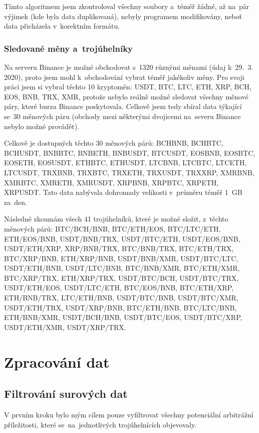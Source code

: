 \documentclass[thesis=B,czech]{FITthesis}[2019/03/21]
\begin{document}
Tímto algoritmem jsem zkontroloval všechny soubory a~téměř žádné, až na~pár výjimek (kde byla data duplikovaná), nebyly programem modifikovány, neboť data přicházela v~korektním formátu.

\subsubsection{Sledované měny a~trojúhelníky}
Na serveru Binance je možné obchodovat s~1320 různými měnami (údaj k~29.~3. 2020), proto jsem mohl k~obchodování vybrat téměř jakékoliv měny. Pro svoji práci jsem si vybral těchto 10 kryptoměn: USDT, BTC, LTC, ETH, XRP, BCH, EOS, BNB, TRX, XMR, protože nebylo reálně možné sledovat všechny měnové páry, které burza Binance poskytovala. Celkově jsem tedy sbíral data týkající se~30 měnových páru (obchody mezi některými dvojicemi na~severu Binance nebylo možné provádět).

Celkově je dostupných těchto 30 měnových párů: BCHBNB, BCHBTC, BCHUSDT, BNBBTC, BNBETH, BNBUSDT, BTCUSDT, EOSBNB,  \linebreak EOSBTC, EOSETH, EOSUSDT, ETHBTC, ETHUSDT, LTCBNB, LTCBTC, LTCETH, LTCUSDT, TRXBNB, TRXBTC, TRXETH, TRXUSDT,  \linebreak TRXXRP, XMRBNB, XMRBTC, XMRETH, XMRUSDT, XRPBNB,  \linebreak XRPBTC, XRPETH, XRPUSDT. Tato data nabývala dohromady velikosti v~průměru téměř 1~GB za~den.

Následně zkoumám všech 41 trojúhelníků, které je možné složit, z~těchto měnových párů: BTC/BCH/BNB, BTC/ETH/EOS, BTC/LTC/ETH,  \linebreak ETH/EOS/BNB, USDT/BNB/TRX, USDT/BTC/ETH, USDT/EOS/BNB, USDT/ETH/XRP, XRP/BNB/TRX, BTC/BNB/TRX, BTC/ETH/TRX,  \linebreak BTC/XRP/BNB, ETH/XRP/BNB, USDT/BNB/XMR, USDT/BTC/LTC, USDT/ETH/BNB, USDT/LTC/BNB, BTC/BNB/XMR, BTC/ETH/XMR, BTC/XRP/TRX, ETH/XRP/TRX, USDT/BTC/BCH, USDT/BTC/TRX, USDT/ETH/EOS, USDT/LTC/ETH, BTC/EOS/BNB, BTC/ETH/XRP,  \linebreak ETH/BNB/TRX, LTC/ETH/BNB, USDT/BTC/BNB, USDT/BTC/XMR, USDT/ETH/TRX, USDT/XRP/BNB, BTC/ETH/BNB, BTC/LTC/BNB, ETH/BNB/XMR, USDT/BCH/BNB, USDT/BTC/EOS, USDT/BTC/XRP, USDT/ETH/XMR, USDT/XRP/TRX.

\section{Zpracování dat}
\subsection{Filtrování surových dat}
V prvním kroku bylo mým cílem pouze vyfiltrovat všechny potenciální arbitrážní příležitosti, které se~na~jednotlivých trojúhelnících objevovaly.
\end{document}
